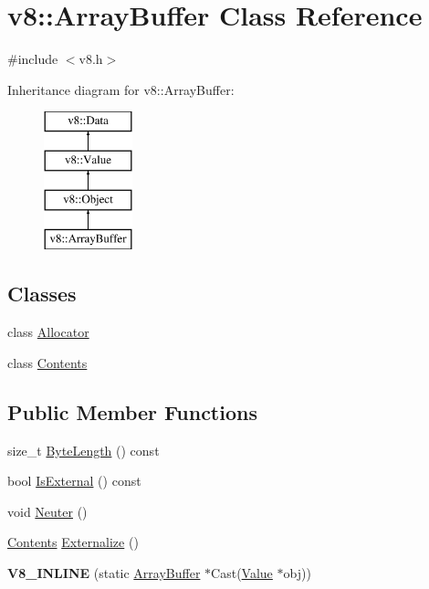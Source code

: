 \hypertarget{classv8_1_1_array_buffer}{}\section{v8\+:\+:Array\+Buffer Class Reference}
\label{classv8_1_1_array_buffer}


{\ttfamily \#include $<$v8.\+h$>$}

Inheritance diagram for v8\+:\+:Array\+Buffer\+:\begin{figure}[H]
\begin{center}
\leavevmode
\includegraphics[height=4.000000cm]{classv8_1_1_array_buffer}
\end{center}
\end{figure}
\subsection*{Classes}
\begin{DoxyCompactItemize}
\item 
class \hyperlink{classv8_1_1_array_buffer_1_1_allocator}{Allocator}
\item 
class \hyperlink{classv8_1_1_array_buffer_1_1_contents}{Contents}
\end{DoxyCompactItemize}
\subsection*{Public Member Functions}
\begin{DoxyCompactItemize}
\item 
size\+\_\+t \hyperlink{classv8_1_1_array_buffer_ab73b98ba6436b57c5a1b3d29429e0199}{Byte\+Length} () const 
\item 
bool \hyperlink{classv8_1_1_array_buffer_a50dd263917559439525048c623425c6f}{Is\+External} () const 
\item 
void \hyperlink{classv8_1_1_array_buffer_a3420f7d38a8fe20e8f40fb82e6acb325}{Neuter} ()
\item 
\hyperlink{classv8_1_1_array_buffer_1_1_contents}{Contents} \hyperlink{classv8_1_1_array_buffer_a8b90b72486cfacb4fbec157f4803f889}{Externalize} ()
\item 
\hypertarget{classv8_1_1_array_buffer_a604dffdc7629e3b952d14016835d7988}{}{\bfseries V8\+\_\+\+I\+N\+L\+I\+N\+E} (static \hyperlink{classv8_1_1_array_buffer}{Array\+Buffer} $\ast$Cast(\hyperlink{classv8_1_1_value}{Value} $\ast$obj))\label{classv8_1_1_array_buffer_a604dffdc7629e3b952d14016835d7988}

\end{DoxyCompactItemize}
